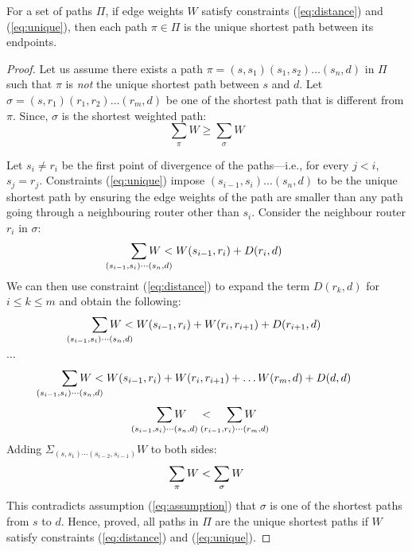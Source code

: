 \begin{theorem}[Soundness]
For a set of paths $\Pi$, if edge weights 
$W$ satisfy constraints (\ref{eq:distance}) and (\ref{eq:unique}), then 
each path $\pi \in \Pi$ is the unique shortest path between its endpoints. 
\end{theorem}
\begin{proof}
	Let us assume there exists a path $\pi
	= (s, s_1)(s_1, s_2) 
	\ldots (s_n, d)$ in $\Pi$ such that $\pi$ is \emph{not} the unique 
	shortest path between $s$ and $d$. Let  $\sigma = (s, r_1)(r_1, r_2)\ldots (r_m,
	 d)$ be one of the shortest path that is different from $\pi$. 	
	\noindent Since, $\sigma$ is the shortest weighted path: 
	\begin{equation} \label{eq:assumption}
	\sum_{\pi} W \geq \sum_{\sigma} W
	\end{equation}
	
	Let $s_i \not= r_i$ be the first point of divergence of the paths---i.e., for every $j<i$, $s_{j} = r_{j}$.
    Constraints (\ref{eq:unique}) 
	impose $(s_{i-1}, s_i)\ldots(s_n, d)$ to be the
	unique shortest path by ensuring the edge weights of the path
	are smaller than any path going through a neighbouring 
	router other than $s_i$. 
	Consider the 
	neighbour router $r_i$ in $\sigma$:
	\[
	\sum_{\mathclap{\substack{(s_{i-1}, s_i)\cdots(s_n, d)}}} 
	W < W(s_{i-1}, r_i)+ D(r_i, d)
	\]
	We can then use constraint (\ref{eq:distance}) to expand the term $D(r_k, d)$ for $i \leq k \leq m$
	and obtain the following: 
	\[
	\sum_{\mathclap{\substack{(s_{i-1}, s_i)\cdots(s_n, d)}}} 
	W < W(s_{i-1}, r_i)+ W(r_i, r_{i+1}) + D(r_{i+1}, d)
	\] 
	\begin{center}
		$\ldots$
	\end{center}
	\[
	\sum_{\mathclap{\substack{(s_{i-1}, s_i)\cdots(s_n, d)}}} 
	W < W(s_{i-1}, r_i)+ W(r_i, r_{i+1}) + \ldots W(r_{m}, d) + D(d, d)
	\] 
	\[
	\sum_{\mathclap{\substack{(s_{i-1}, s_i)\cdots(s_n, d)}}} 
	W \hspace{0.4cm}< \hspace{0.4cm}
	\sum_{\mathclap{\substack{(r_{i-1}, r_i)\cdots(r_m, d)}}} 
	W
	\]
	Adding $\Sigma_{(s, s_1)\cdots(s_{i-2},s_{i-1})}W$ to both sides:
	\[
	\sum_{\mathclap{\substack{\pi}}} 
	W < 
	\sum_{\mathclap{\substack{\sigma}}} 
	W
	\] 
	This contradicts assumption (\ref{eq:assumption}) that 
	$\sigma$ is one of the shortest paths from $s$ to $d$. 
	Hence, proved, all paths in $\Pi$ are the unique shortest paths if $W$
	satisfy constraints (\ref{eq:distance}) and (\ref{eq:unique}).
\end{proof}

